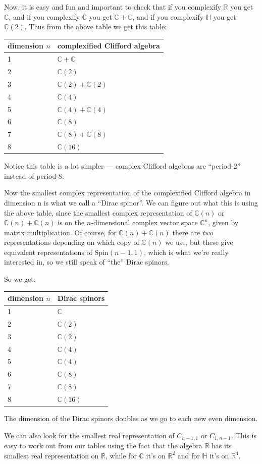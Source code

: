 \documentclass{article}
\begin{document}
Now, it is easy and fun and important to check that if you complexify
\(\mathbb{R}\) you get \(\mathbb{C}\), and if you complexify
\(\mathbb{C}\) you get \(\mathbb{C}+\mathbb{C}\), and if you complexify
\(\mathbb{H}\) you get \(\mathbb{C}(2)\). Thus from the above table we
get this table:

\begin{longtable}[]{@{}ll@{}}
\toprule
dimension \(n\) & complexified Clifford algebra\tabularnewline
\midrule
\endhead
1 & \(\mathbb{C}+\mathbb{C}\)\tabularnewline
2 & \(\mathbb{C}(2)\)\tabularnewline
3 & \(\mathbb{C}(2)+\mathbb{C}(2)\)\tabularnewline
4 & \(\mathbb{C}(4)\)\tabularnewline
5 & \(\mathbb{C}(4)+\mathbb{C}(4)\)\tabularnewline
6 & \(\mathbb{C}(8)\)\tabularnewline
7 & \(\mathbb{C}(8)+\mathbb{C}(8)\)\tabularnewline
8 & \(\mathbb{C}(16)\)\tabularnewline
\bottomrule
\end{longtable}

Notice this table is a lot simpler --- complex Clifford algebras are
``period-2'' instead of period-8.

Now the smallest complex representation of the complexified Clifford
algebra in dimension n is what we call a ``Dirac spinor''. We can figure
out what this is using the above table, since the smallest complex
representation of \(\mathbb{C}(n)\) or \(\mathbb{C}(n) + \mathbb{C}(n)\)
is on the \(n\)-dimensional complex vector space \(\mathbb{C}^n\), given
by matrix multiplication. Of course, for
\(\mathbb{C}(n) + \mathbb{C}(n)\) there are \emph{two} representations
depending on which copy of \(\mathbb{C}(n)\) we use, but these give
equivalent representations of \(\mathrm{Spin}(n-1,1)\), which is what
we're really interested in, so we still speak of ``the'' Dirac spinors.

So we get:

\begin{longtable}[]{@{}ll@{}}
\toprule
dimension \(n\) & Dirac spinors\tabularnewline
\midrule
\endhead
1 & \(\mathbb{C}\)\tabularnewline
2 & \(\mathbb{C}(2)\)\tabularnewline
3 & \(\mathbb{C}(2)\)\tabularnewline
4 & \(\mathbb{C}(4)\)\tabularnewline
5 & \(\mathbb{C}(4)\)\tabularnewline
6 & \(\mathbb{C}(8)\)\tabularnewline
7 & \(\mathbb{C}(8)\)\tabularnewline
8 & \(\mathbb{C}(16)\)\tabularnewline
\bottomrule
\end{longtable}

The dimension of the Dirac spinors doubles as we go to each new even
dimension.

We can also look for the smallest real representation of \(C_{n-1,1}\)
or \(C_{1,n-1}\). This is easy to work out from our tables using the
fact that the algebra \(\mathbb{R}\) has its smallest real
representation on \(\mathbb{R}\), while for \(\mathbb{C}\) it's on
\(\mathbb{R}^2\) and for \(\mathbb{H}\) it's on \(\mathbb{R}^4\).
\end{document}
